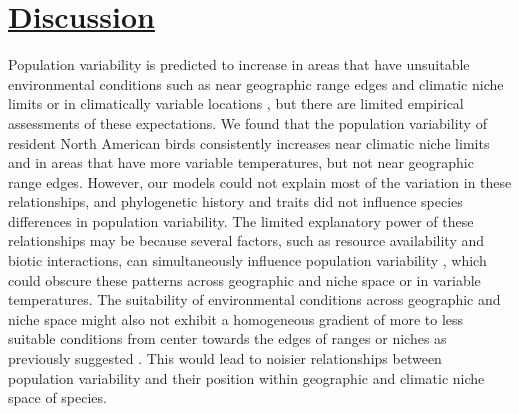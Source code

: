 \section*{\textbf{\underline{Discussion}}}
Population variability is predicted to increase in areas that have unsuitable environmental conditions such as near geographic range edges and climatic niche limits or in climatically variable locations  \parencite{pironon2017,burgess2020,tencaten2025}, but there are limited empirical assessments of these expectations. We found that the population variability of resident North American birds consistently increases near climatic niche limits and in areas that have more variable temperatures, but not near geographic range edges. However, our models could not explain most of the variation in these relationships, and phylogenetic history and traits did not influence species differences in population variability. The limited explanatory power of these relationships may be because several factors, such as resource availability and biotic interactions, can simultaneously influence population variability \parencite{lundberg2000, tencaten2025}, which could obscure these patterns across geographic and niche space or in variable temperatures. The suitability of environmental conditions across geographic and niche space might also not exhibit a homogeneous gradient of more to less suitable conditions from center towards the edges of ranges or niches as previously suggested \parencite{brown1984, martinez2013}. This would lead to noisier relationships between population variability and their position within geographic and climatic niche space of species.  
  
